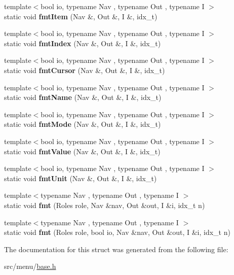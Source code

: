 \begin{DoxyCompactItemize}
{\footnotesize template$<$bool io, typename Nav , typename Out , typename I $>$ }\\static void {\bfseries fmt\+Item} (Nav \&, Out \&, I \&, idx\+\_\+t)
\item 
\mbox{\label{structVoid_a46b2b0ec0bf70a25f478ba1d8e767421}} 
{\footnotesize template$<$bool io, typename Nav , typename Out , typename I $>$ }\\static void {\bfseries fmt\+Index} (Nav \&, Out \&, I \&, idx\+\_\+t)
\item 
\mbox{\label{structVoid_ab7dd17b2727b97dfb25a891837ba0a18}} 
{\footnotesize template$<$bool io, typename Nav , typename Out , typename I $>$ }\\static void {\bfseries fmt\+Cursor} (Nav \&, Out \&, I \&, idx\+\_\+t)
\item 
\mbox{\label{structVoid_af0ee2c39009bc222ddbb55497644fa9c}} 
{\footnotesize template$<$bool io, typename Nav , typename Out , typename I $>$ }\\static void {\bfseries fmt\+Name} (Nav \&, Out \&, I \&, idx\+\_\+t)
\item 
\mbox{\label{structVoid_a8d06d06e92f56fa19b38c687e235fe36}} 
{\footnotesize template$<$bool io, typename Nav , typename Out , typename I $>$ }\\static void {\bfseries fmt\+Mode} (Nav \&, Out \&, I \&, idx\+\_\+t)
\item 
\mbox{\label{structVoid_a9666a26be86627c1af81f53f9ed37346}} 
{\footnotesize template$<$bool io, typename Nav , typename Out , typename I $>$ }\\static void {\bfseries fmt\+Value} (Nav \&, Out \&, I \&, idx\+\_\+t)
\item 
\mbox{\label{structVoid_a555eb9d8a88433ad1caa943907ac4bb9}} 
{\footnotesize template$<$bool io, typename Nav , typename Out , typename I $>$ }\\static void {\bfseries fmt\+Unit} (Nav \&, Out \&, I \&, idx\+\_\+t)
\item 
\mbox{\label{structVoid_abeab9c3c5bd4506ba5a7ef8492df8c96}} 
{\footnotesize template$<$typename Nav , typename Out , typename I $>$ }\\static void {\bfseries fmt} (Roles role, Nav \&nav, Out \&out, I \&i, idx\+\_\+t n)
\item 
\mbox{\label{structVoid_a382f58de2cd5316efae410bda2abc33c}} 
{\footnotesize template$<$typename Nav , typename Out , typename I $>$ }\\static void {\bfseries fmt} (Roles role, bool io, Nav \&nav, Out \&out, I \&i, idx\+\_\+t n)
\end{DoxyCompactItemize}


The documentation for this struct was generated from the following file\+:\begin{DoxyCompactItemize}
\item 
src/menu/\hyperlink{base_8h}{base.\+h}\end{DoxyCompactItemize}
